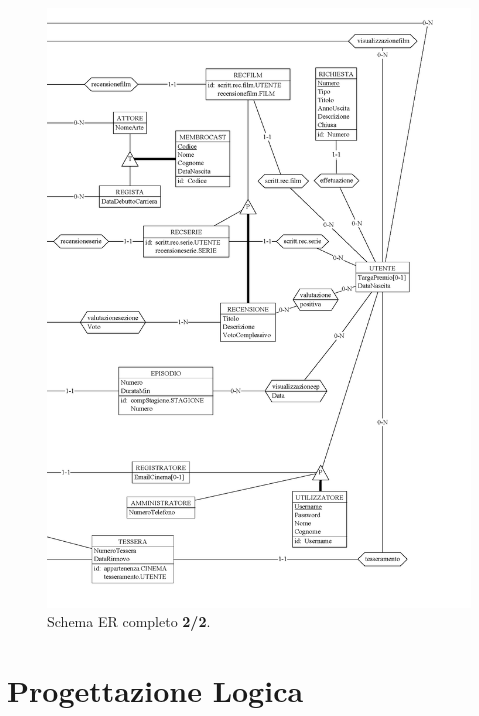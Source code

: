\documentclass[a4paper,12pt]{report}
\begin{document}
\begin{figure}[H]
	\centering
	\includegraphics[width=450pt]{ER/ercompletodx.png}
	\caption{Schema ER completo \textbf{2/2}.}
\end{figure}
\chapter{Progettazione Logica}
\end{document}
